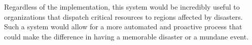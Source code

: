 Regardless of the implementation, this system would be incredibly useful to organizations that dispatch critical resources to regions affected by disasters.
Such a system would allow for a more automated and proactive process that could make the difference in having a memorable disaster or a mundane event.
